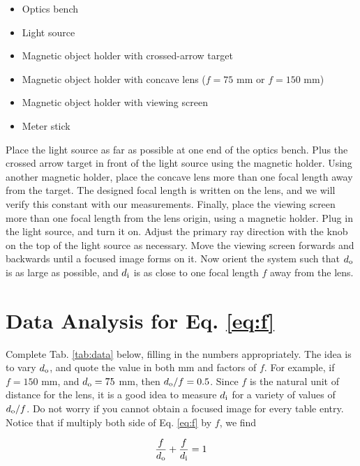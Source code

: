 \documentclass[12pt,twocolumn]{article}
\begin{document}
\begin{itemize}
\item Optics bench
\item Light source
\item Magnetic object holder with crossed-arrow target
\item Magnetic object holder with concave lens ($f = 75$ mm or $f=150$ mm)
\item Magnetic object holder with viewing screen
\item Meter stick
\end{itemize}

Place the light source as far as possible at one end of the optics bench.  Plus the crossed arrow target in front of the light source using the magnetic holder.  Using another magnetic holder, place the concave lens more than one focal length away from the target.  The designed focal length is written on the lens, and we will verify this constant with our measurements.  Finally, place the viewing screen more than one focal length from the lens origin, using a magnetic holder.  Plug in the light source, and turn it on.  Adjust the primary ray direction with the knob on the top of the light source as necessary.  Move the viewing screen forwards and backwards until a focused image forms on it.  Now orient the system such that $d_{\rm o}$ is as large as possible, and $d_{\rm i}$ is as close to one focal length $f$ away from the lens.

\section{Data Analysis for Eq. \ref{eq:f}}

\noindent
Complete Tab. \ref{tab:data} below, filling in the numbers appropriately.  The idea is to vary $d_{\rm o}$, and quote the value in both mm and factors of $f$.  For example, if $f = 150$ mm, and $d_{\rm o} = 75$ mm, then $d_{\rm o}/f = 0.5$.  Since $f$ is the natural unit of distance for the lens, it is a good idea to measure $d_{\rm i}$ for a variety of values of $d_{\rm o}/f$.  Do not worry if you cannot obtain a focused image for every table entry.  Notice that if multiply both side of Eq. \ref{eq:f} by $f$, we find

\begin{equation}
\frac{f}{d_{\rm o}} + \frac{f}{d_{\rm i}} = 1
\end{equation}
\end{document}
